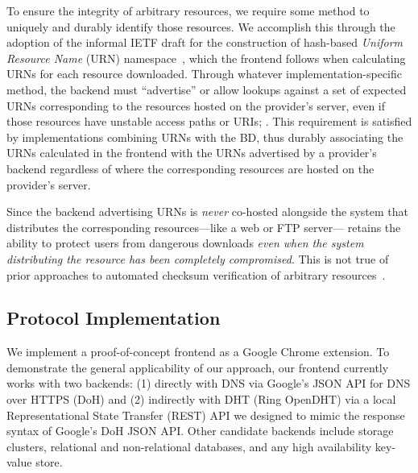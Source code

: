 To ensure the integrity of arbitrary resources, we require some method to
uniquely and durably identify those resources. We accomplish this through the
adoption of the informal IETF draft for the construction of hash-based
\emph{Uniform Resource Name} (URN) namespace~\cite{draft-URN}, which the
frontend follows when calculating URNs for each resource downloaded. Through
whatever implementation-specific method, the backend must ``advertise'' or allow
lookups against a set of expected URNs corresponding to the resources hosted on
the provider's server, even if those resources have unstable access paths or
URIs; . This requirement is satisfied by implementations combining URNs with
the BD, thus durably associating the URNs calculated in the frontend with the
URNs advertised by a provider's backend regardless of where the corresponding
resources are hosted on the provider's server.

Since the backend advertising URNs is \emph{never} co-hosted alongside the
system that distributes the corresponding resources---like a web or FTP
server---\SYSTEM{} retains the ability to protect users from dangerous downloads
\emph{even when the system distributing the resource has been completely
compromised}. This is not true of prior approaches to automated checksum
verification of arbitrary resources~\cite{Cherubini}.

\subsection{Protocol Implementation}

We implement a proof-of-concept \SYSTEM{} frontend as a Google Chrome extension.
To demonstrate the general applicability of our approach, our frontend currently
works with two backends: (1) directly with DNS via Google's JSON API for DNS
over HTTPS (DoH) and (2) indirectly with DHT (Ring OpenDHT) via a local
Representational State Transfer (REST) API we designed to mimic the response
syntax of Google's DoH JSON API. Other candidate backends include storage
clusters, relational and non-relational databases, and any high availability
key-value store.

